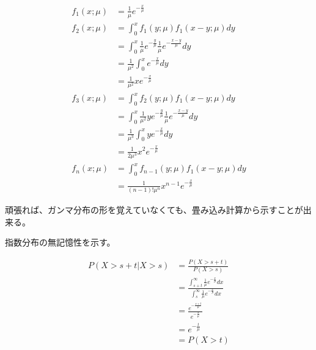 \documentclass[a4paper, 10pt, dvipdfmx]{jlreq}
\begin{document}
\begin{align*}
  f_1(x;\mu) & =\frac{1}{\mu}e^{-\frac{x}{\mu}}                                                 \\
  f_2(x;\mu) & =\int_0^x{f_1(y;\mu)f_1(x-y;\mu)dy}                                              \\
             & =\int_0^x{\frac{1}{\mu}e^{-\frac{y}{\mu}}\frac{1}{\mu}e^{-\frac{x-y}{\mu}}dy}    \\
             & =\frac{1}{\mu^2}\int_0^x{e^{-\frac{x}{\mu}}dy}                                   \\
             & =\frac{1}{\mu^2}xe^{-\frac{x}{\mu}}                                              \\
  f_3(x;\mu) & =\int_0^x{f_2(y;\mu)f_1(x-y;\mu)dy}                                              \\
             & =\int_0^x{\frac{1}{\mu^2}ye^{-\frac{y}{\mu}}\frac{1}{\mu}e^{-\frac{x-y}{\mu}}dy} \\
             & =\frac{1}{\mu^3}\int_0^x{ye^{-\frac{x}{\mu}}dy}                                  \\
             & =\frac{1}{2\mu^3}x^2e^{-\frac{x}{\mu}}                                           \\
  f_n(x;\mu) & =\int_0^x{f_{n-1}(y;\mu)f_1(x-y;\mu)dy}                                          \\
             & =\frac{1}{(n-1)!\mu^n} x^{n-1} e^{-\frac{x}{\mu}}
\end{align*}

頑張れば、ガンマ分布の形を覚えていなくても、畳み込み計算から示すことが出来る。

指数分布の無記憶性を示す。

\begin{align*}
  P(X>s+t|X>s) & =\frac{P(X>s+t)}{P(X>s)}                                                                                         \\
               & =\frac{\int_{s+t}^{\infty}\frac{1}{\mu}e^{-\frac{x}{\mu}}dx}{\int_{s}^{\infty}\frac{1}{\mu}e^{-\frac{x}{\mu}}dx} \\
               & =\frac{e^{-\frac{s+t}{\mu}}}{e^{-\frac{s}{\mu}}}                                                                 \\
               & =e^{-\frac{t}{\mu}}                                                                                              \\
               & =P(X>t)                                                                                                          \\
\end{align*}
\end{document}
